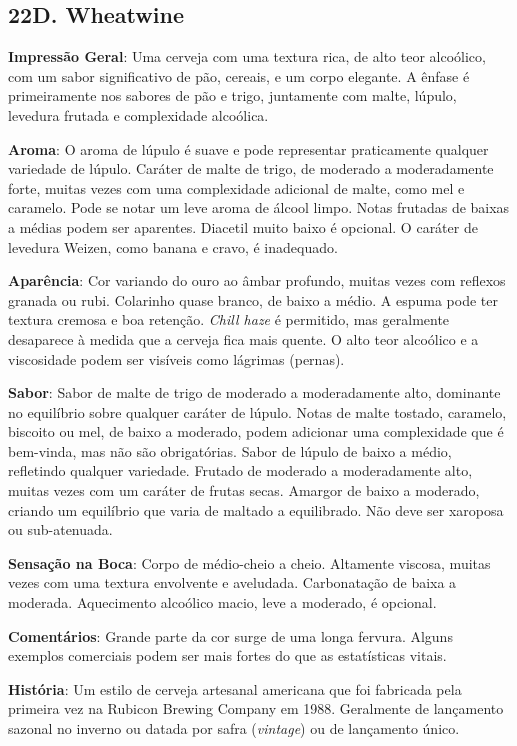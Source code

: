 \subsection*{22D. Wheatwine}
\textbf{Impressão Geral}: Uma cerveja com uma textura rica, de alto teor alcoólico, com um sabor significativo de pão, cereais, e um corpo elegante. A ênfase é primeiramente nos sabores de pão e trigo, juntamente com malte, lúpulo, levedura frutada e complexidade alcoólica.

\textbf{Aroma}: O aroma de lúpulo é suave e pode representar praticamente qualquer variedade de lúpulo. Caráter de malte de trigo, de moderado a moderadamente forte, muitas vezes com uma complexidade adicional de malte, como mel e caramelo. Pode se notar um leve aroma de álcool limpo. Notas frutadas de baixas a médias podem ser aparentes. Diacetil muito baixo é opcional. O caráter de levedura Weizen, como banana e cravo, é inadequado.

\textbf{Aparência}: Cor variando do ouro ao âmbar profundo, muitas vezes com reflexos granada ou rubi. Colarinho quase branco, de baixo a médio. A espuma pode ter textura cremosa e boa retenção. \textit{Chill haze} é permitido, mas geralmente desaparece à medida que a cerveja fica mais quente. O alto teor alcoólico e a viscosidade podem ser visíveis como lágrimas (pernas).

\textbf{Sabor}: Sabor de malte de trigo de moderado a moderadamente alto, dominante no equilíbrio sobre qualquer caráter de lúpulo. Notas de malte tostado, caramelo, biscoito ou mel, de baixo a moderado, podem adicionar uma complexidade que é bem-vinda, mas não são obrigatórias. Sabor de lúpulo de baixo a médio, refletindo qualquer variedade. Frutado de moderado a moderadamente alto, muitas vezes com um caráter de frutas secas. Amargor de baixo a moderado, criando um equilíbrio que varia de maltado a equilibrado. Não deve ser xaroposa ou sub-atenuada.

\textbf{Sensação na Boca}: Corpo de médio-cheio a cheio. Altamente viscosa, muitas vezes com uma textura envolvente e aveludada. Carbonatação de baixa a moderada. Aquecimento alcoólico macio, leve a moderado, é opcional.

\textbf{Comentários}: Grande parte da cor surge de uma longa fervura. Alguns exemplos comerciais podem ser mais fortes do que as estatísticas vitais.

\textbf{História}: Um estilo de cerveja artesanal americana que foi fabricada pela primeira vez na Rubicon Brewing Company em 1988. Geralmente de lançamento sazonal no inverno ou datada por safra (\textit{vintage}) ou de lançamento único.

